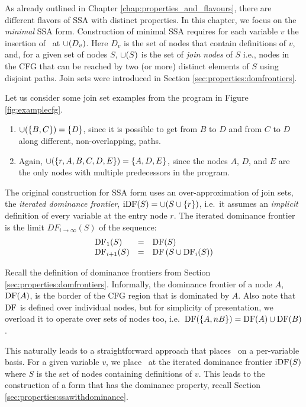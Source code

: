 As already outlined in Chapter \ref{chap:properties_and_flavours},
there are different flavors of SSA with distinct properties.
In this chapter, we focus on the \textit{minimal} SSA form.
Construction of minimal SSA 
requires for each variable $v$ the insertion of \phiops\ at $\cup(D_v)$.
Here $D_v$ is the set of nodes that contain definitions of $v$, and,
for a given set of nodes $S$, $\cup(S)$ is the set of
\textit{join nodes} of $S$
i.e., nodes in the CFG that can be reached by
two (or more) distinct elements of $S$ using disjoint paths.
Join sets were introduced in Section \ref{sec:properties:domfrontiers}.

Let us consider some join set examples from the
program in Figure \ref{fig:examplecfg}.
\begin{enumerate}
\item $\cup(\{B,C\}) = \{D\}$, since it is possible to get from $B$ to $D$
and from $C$ to $D$ along different, non-overlapping, paths.
\item Again, $\cup(\{r, A, B, C, D, E \}) = \{A,D,E\}$, since the nodes
$A$, $D$, and $E$ are the only nodes with multiple predecessors in
the program.
\end{enumerate}

 
The original construction for SSA form uses an over-approximation of
join sets, the
\emph{iterated dominance frontier}, $\mathrm{iDF}(S)=\cup(S\cup
\{r\})$, i.e.\ it assumes an \emph{implicit} definition of every
variable at the entry node $r$.
The iterated dominance frontier is the limit $DF_{i\rightarrow\infty}(S)$
of the sequence:
$$\begin{array}{lll}
\mathrm{DF}_1(S) & = & \mathrm{DF}(S)\\
\mathrm{DF}_{i+1}(S) & = & \mathrm{DF}\left(S\cup \mathrm{DF}_i(S)\right)
\end{array}$$

Recall the definition of dominance frontiers from Section
\ref{sec:properties:domfrontiers}.
Informally, the dominance frontier of a node $A$, $\mathrm{DF}(A)$,
is the border of the CFG region that is dominated by $A$.
Also note that $\mathrm{DF}$ is defined over individual nodes, 
but for simplicity of presentation, we overload it to 
operate over sets of nodes too, i.e.\ 
$\mathrm{DF}(\{A,nB\}) = \mathrm{DF}(A) \cup \mathrm{DF}(B)$.

This naturally leads to a
straightforward approach that places \phiops\
on a per-variable basis.
For a given variable $v$, we place \phiops\ at the
iterated dominance frontier $\mathrm{iDF}(S)$ where
$S$ is the set of nodes containing definitions of $v$.
This leads to the construction of a form that has 
the dominance property, recall
Section \ref{sec:properties:ssawithdominance}.

